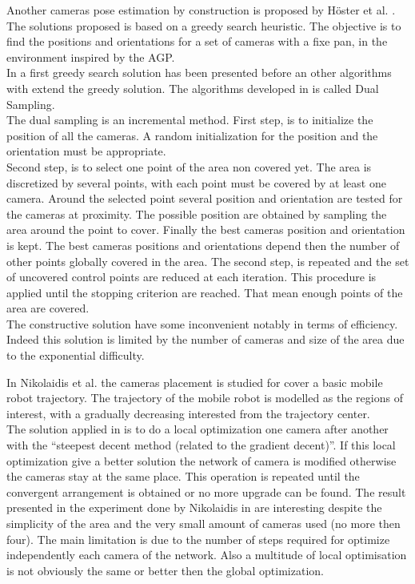Another cameras pose estimation by construction is proposed by Höster et al. \cite{171*horster2006}.
The solutions proposed is based on a greedy search heuristic. The objective is to find the positions and orientations for a set of cameras with a fixe pan, in the environment inspired by the AGP. \\
In \cite{171*horster2006} a first greedy search solution has been presented before an other algorithms with extend the greedy solution. The algorithms developed in \cite{171*horster2006} is called Dual Sampling.\\
The dual sampling is an incremental method. 
First step, is to initialize the position of all the cameras. A random initialization for the position and the orientation must be appropriate.  \\
Second step, is to select one point of the area non covered yet. The area is discretized by several points, with each point must be covered by at least one camera. Around the selected point several position and orientation are tested for the cameras at proximity. The possible position are obtained by sampling the area around the point to cover. Finally the best cameras position and orientation is kept. The best cameras positions and orientations depend then the number of other points globally covered in the area. 
The second step, is repeated and the set of uncovered control points are reduced at each iteration. This procedure is applied until the stopping criterion are reached. That mean enough points of the area are covered. \\
The constructive solution have some inconvenient notably in terms of efficiency. Indeed this solution is limited by the number of cameras and size of the area due to the exponential difficulty. %

In Nikolaidis et al. \cite{81*nikolaidis2009} the cameras placement is studied for cover a basic mobile robot trajectory.
The trajectory of the mobile robot is modelled as the regions of interest, with a gradually decreasing interested from the trajectory center.\\
  The solution applied in \cite{81*nikolaidis2009} is to do a local optimization one camera after another with the “steepest decent method (related to  the gradient decent)”. If this local optimization give a better solution the network of camera is modified otherwise the cameras stay at the same place. This operation is repeated until the convergent arrangement is obtained or no more upgrade can be found. The result presented in the experiment done by Nikolaidis in  \cite{81*nikolaidis2009} are interesting despite the simplicity of the area and the very small amount of cameras used (no more then four). The main limitation is due to the number of steps required for optimize independently each camera of the network. Also a multitude of local optimisation is not obviously the same or better then the global optimization.

